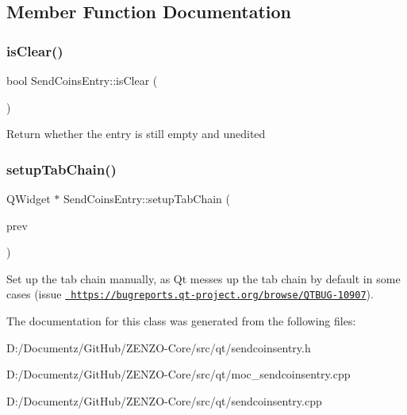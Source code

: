 \subsection{Member Function Documentation}
\mbox{\label{class_send_coins_entry_a1dcce9480364868dfd0bb8782e039e57}} 
\subsubsection{\texorpdfstring{isClear()}{isClear()}}
{\footnotesize\ttfamily bool Send\+Coins\+Entry\+::is\+Clear (\begin{DoxyParamCaption}{ }\end{DoxyParamCaption})}

Return whether the entry is still empty and unedited \mbox{\label{class_send_coins_entry_aa431a0bf53174b3a012fe224e472bc13}} 
\subsubsection{\texorpdfstring{setupTabChain()}{setupTabChain()}}
{\footnotesize\ttfamily Q\+Widget $\ast$ Send\+Coins\+Entry\+::setup\+Tab\+Chain (\begin{DoxyParamCaption}\item[{Q\+Widget $\ast$}]{prev }\end{DoxyParamCaption})}

Set up the tab chain manually, as Qt messes up the tab chain by default in some cases (issue \href{https://bugreports.qt-project.org/browse/QTBUG-10907}{\texttt{ https\+://bugreports.\+qt-\/project.\+org/browse/\+Q\+T\+B\+U\+G-\/10907}}). 

The documentation for this class was generated from the following files\+:\begin{DoxyCompactItemize}
\item 
D\+:/\+Documentz/\+Git\+Hub/\+Z\+E\+N\+Z\+O-\/\+Core/src/qt/sendcoinsentry.\+h\item 
D\+:/\+Documentz/\+Git\+Hub/\+Z\+E\+N\+Z\+O-\/\+Core/src/qt/moc\+\_\+sendcoinsentry.\+cpp\item 
D\+:/\+Documentz/\+Git\+Hub/\+Z\+E\+N\+Z\+O-\/\+Core/src/qt/sendcoinsentry.\+cpp\end{DoxyCompactItemize}
